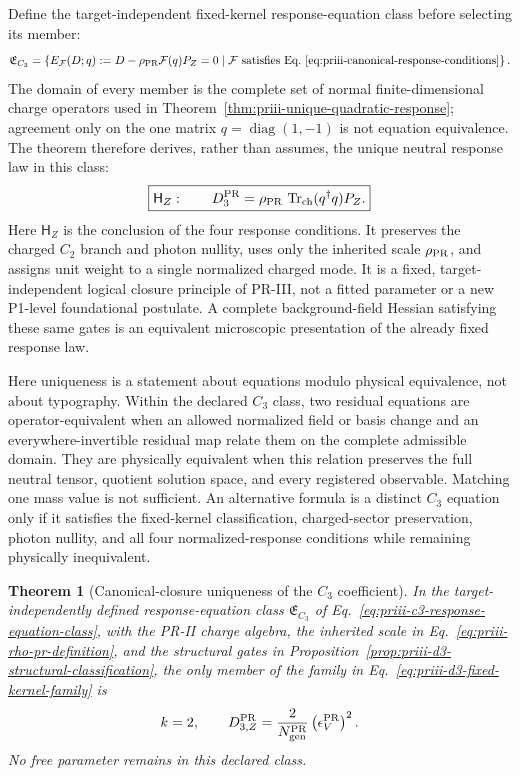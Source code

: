 \documentclass[11pt]{article}
\newtheorem{theorem}{Theorem}[section]
\begin{document}
Define the target-independent fixed-kernel response-equation class before
selecting its member:
\begin{equation}
\mathfrak E_{C_3}
=
\left\{
 E_{\mathcal F}(D;q):=
 D-\rho_{\rm PR}\mathcal F(q)P_Z=0
 \;\middle|\;
 \mathcal F\text{ satisfies
 Eq.~\eqref{eq:priii-canonical-response-conditions}}
\right\}.
\label{eq:priii-c3-response-equation-class}
\end{equation}
The domain of every member is the complete set of normal finite-dimensional
charge operators used in
Theorem~\ref{thm:priii-unique-quadratic-response}; agreement only on the one
matrix $q=\operatorname{diag}(1,-1)$ is not equation equivalence.  The theorem
therefore derives, rather than assumes, the unique neutral response
law in this class:
\begin{equation}
\boxed{
\mathsf H_Z:\qquad
D_3^{\rm PR}
=
\rho_{\rm PR}\,
\operatorname{Tr}_{\rm ch}(q^\dagger q)P_Z .
}
\label{eq:priii-neutral-response-hypothesis}
\end{equation}
Here \(\mathsf H_Z\) is the conclusion of the four response conditions.  It
preserves the charged \(C_2\) branch and photon nullity,
uses only the inherited scale \(\rho_{\rm PR}\), and assigns unit weight to a
single normalized charged mode.  It is a fixed, target-independent logical
closure principle of PR-III, not a fitted parameter or a new P1-level
foundational postulate.  A complete background-field Hessian satisfying these
same gates is an equivalent microscopic presentation of the already fixed
response law.

Here uniqueness is a statement about equations modulo physical equivalence,
not about typography.  Within the declared \(C_3\) class, two residual equations
are operator-equivalent when an allowed normalized field or basis change and an
everywhere-invertible residual map relate them on the complete admissible
domain.  They are physically equivalent when this relation preserves the full
neutral tensor, quotient solution space, and every registered observable.
Matching one mass value is not sufficient.  An alternative formula is a
distinct \(C_3\) equation only if it satisfies the fixed-kernel classification,
charged-sector preservation, photon nullity, and all four normalized-response
conditions while remaining physically inequivalent.

\begin{theorem}[Canonical-closure uniqueness of the \(C_3\) coefficient]
\label{thm:priii-conditional-k-two}
In the target-independently defined response-equation class
$\mathfrak E_{C_3}$ of
Eq.~\eqref{eq:priii-c3-response-equation-class}, with the PR-II charge algebra,
the inherited scale in Eq.~\eqref{eq:priii-rho-pr-definition}, and the
structural gates in
Proposition~\ref{prop:priii-d3-structural-classification}, the only member of
the family in Eq.~\eqref{eq:priii-d3-fixed-kernel-family} is
\begin{equation}
k=2,
\qquad
D_{3,Z}^{\rm PR}
=
\frac{2}{N_{\rm gen}^{\rm PR}}
\left(\epsilon_V^{\rm PR}\right)^2.
\label{eq:priii-ew-D3-neutral}
\end{equation}
No free parameter remains in this declared class.
\end{theorem}
\end{document}
